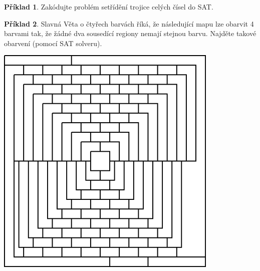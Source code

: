 \documentclass{amsart}
\theoremstyle{definition}
\newtheorem{problem}{Příklad}
\begin{document}
\begin{problem}
Zakódujte problém setřídění trojice celých čísel do SAT.
\end{problem}



\begin{problem}
Slavná Věta o čtyřech barvách říká, že následující mapu lze obarvit 4 barvami tak, že žádné dva sousedící regiony nemají stejnou barvu. Najděte takové obarvení (pomocí SAT solveru).
\begin{center}
\includegraphics[width=0.8\textwidth]{files/map.png}
\end{center}
\end{problem}
\end{document}
